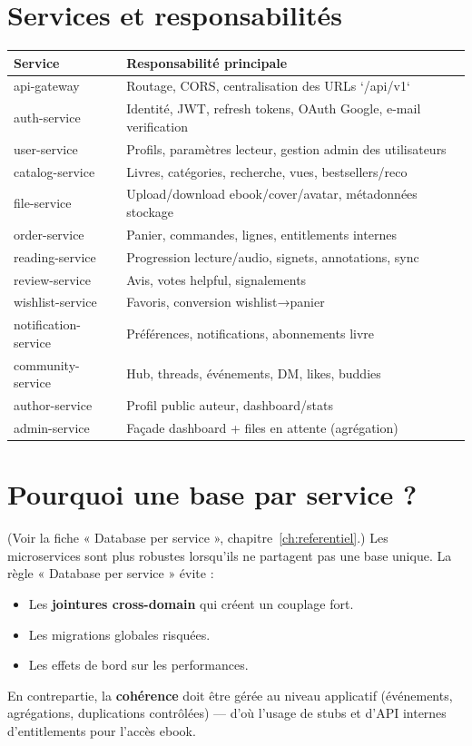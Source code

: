 \documentclass[12pt,a4paper]{report}
\begin{document}
\section{Services et responsabilités}
\begin{longtable}{@{}p{}p{}@{}}
\toprule
\textbf{Service} & \textbf{Responsabilité principale} \\ \midrule
api-gateway & Routage, CORS, centralisation des URLs `/api/v1` \\ 
auth-service & Identité, JWT, refresh tokens, OAuth Google, e-mail verification \\ 
user-service & Profils, paramètres lecteur, gestion admin des utilisateurs \\ 
catalog-service & Livres, catégories, recherche, vues, bestsellers/reco \\ 
file-service & Upload/download ebook/cover/avatar, métadonnées stockage \\ 
order-service & Panier, commandes, lignes, entitlements internes \\ 
reading-service & Progression lecture/audio, signets, annotations, sync \\ 
review-service & Avis, votes helpful, signalements \\ 
wishlist-service & Favoris, conversion wishlist→panier \\ 
notification-service & Préférences, notifications, abonnements livre \\ 
community-service & Hub, threads, événements, DM, likes, buddies \\ 
author-service & Profil public auteur, dashboard/stats \\ 
admin-service & Façade dashboard + files en attente (agrégation) \\ \bottomrule
\end{longtable}

\section{Pourquoi une base par service ?}
(Voir la fiche « Database per service », chapitre~\ref{ch:referentiel}.) Les microservices sont plus robustes lorsqu'ils ne partagent pas une base unique. La règle « Database per service » évite :
\begin{itemize}
  \item Les \textbf{jointures cross-domain} qui créent un couplage fort.
  \item Les migrations globales risquées.
  \item Les effets de bord sur les performances.
\end{itemize}
En contrepartie, la \textbf{cohérence} doit être gérée au niveau applicatif (événements, agrégations, duplications contrôlées) — d'où l'usage de stubs et d'API internes d'entitlements pour l'accès ebook.\par
\end{document}
